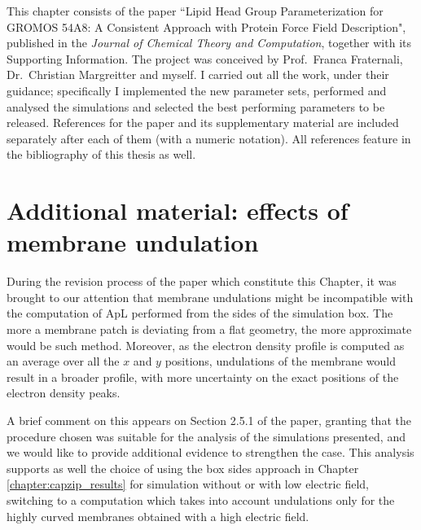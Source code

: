 This chapter consists of the paper ``Lipid Head Group Parameterization for GROMOS 54A8: A Consistent Approach with Protein Force Field Description", published in the \emph{Journal of Chemical Theory and Computation}, together with its Supporting Information. The project was conceived by Prof.\ Franca Fraternali, Dr.\ Christian Margreitter and myself. I carried out all the work, under their guidance; specifically I implemented the new parameter sets, performed and analysed the simulations and selected the best performing parameters to be released. References for the paper and its supplementary material are included separately after each of them (with a numeric notation). All references feature in the bibliography of this thesis as well.

%

%
%
%
%
%
\clearpage

\section{Additional material: effects of membrane undulation}

During the revision process of the paper which constitute this Chapter, it was brought to our attention that membrane undulations might be incompatible with the computation of ApL performed from the sides of the simulation box. The more a membrane patch is deviating from a flat geometry, the more approximate would be such method.
%
Moreover, as the electron density profile is computed as an average over all the $x$ and $y$ positions, undulations of the membrane would result in a broader profile, with more uncertainty on the exact positions of the electron density peaks.

A brief comment on this appears on Section 2.5.1 of the paper, granting that the procedure chosen was suitable for the analysis of the simulations presented, and we would like to provide additional evidence to strengthen the case.
%
This analysis supports as well the choice of using the box sides approach in Chapter \ref{chapter:capzip_results} for simulation without or with low electric field, switching to a computation which takes into account undulations only for the highly curved membranes obtained with a high electric field.

